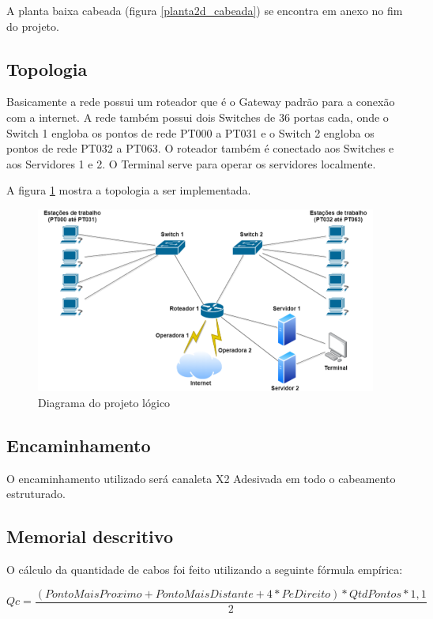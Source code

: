 \documentclass[	DIV=calc,%
							paper=a4,%
							fontsize=12pt,%
							onecolumn]{scrartcl}	 					%
\begin{document}
A planta baixa cabeada (figura \ref{planta2d_cabeada}) se encontra em anexo no fim do projeto. 

\subsection{Topologia}

Basicamente a rede possui um roteador que é o Gateway padrão para a conexão com a internet. A rede também possui dois Switches de 36 portas cada, onde o Switch 1 engloba os pontos de rede PT000 a PT031 e o Switch 2 engloba os pontos de rede PT032 a PT063. O roteador também é conectado aos Switches e aos Servidores 1 e 2. O Terminal serve para operar os servidores localmente. 

A figura \ref{topologia} mostra a topologia a ser implementada.

\begin{figure}
	\centering
	\includegraphics[width=\textwidth]{topologia}
	\caption{Diagrama do projeto lógico}
	\label{topologia}
\end{figure}


\subsection{Encaminhamento}

O encaminhamento utilizado será canaleta X2 Adesivada em todo o cabeamento estruturado.

\subsection{Memorial descritivo}

O cálculo da quantidade de cabos foi feito utilizando a seguinte fórmula empírica: 

\begin{equation}
Qc = \frac{(Ponto Mais Proximo + Ponto Mais Distante + 4*PeDireito)*QtdPontos*1,1}{2}
\end{equation}
\end{document}
